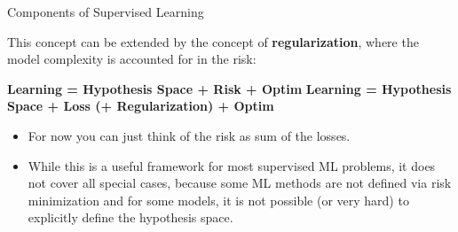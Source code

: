 \documentclass[11pt,compress,t,notes=noshow, xcolor=table]{beamer}
\begin{document}
\begin{vbframe}{Components of Supervised Learning}

This concept can be extended by the concept of \textbf{regularization}, where the model complexity is accounted for in the risk:

\lz


  \textbf{Learning = Hypothesis Space +  Risk + Optim }
  \textbf{Learning = Hypothesis Space + Loss (+ Regularization) + Optim}
  

\lz

\begin{itemize}

  \item For now you can just think of the risk as sum of the losses.
  
  \item While this is a useful framework for most supervised ML problems, it does not cover all special cases, because some ML methods are not defined via risk minimization and for some models, it is not possible (or very hard) to explicitly define the hypothesis space.
  
\end{itemize}

\end{vbframe}

\end{document}

